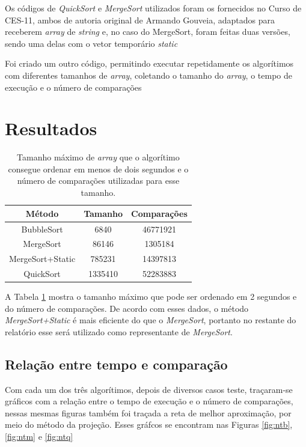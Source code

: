 \documentclass[12pt,a4paper,oneside]{article}
\begin{document}
\quad Os códigos de \textit{QuickSort} e \textit{MergeSort} utilizados foram os fornecidos no Curso de CES-11, ambos de autoria original de Armando Gouveia, adaptados para receberem \textit{array} de \textit{string} e, no caso do MergeSort, foram feitas duas versões, sendo uma delas com o vetor temporário \textit{static}

\quad Foi criado um outro código, permitindo executar repetidamente os algorítimos com diferentes tamanhos de \textit{array}, coletando o tamanho do \textit{array}, o tempo de execução e o número de comparações

\section{Resultados}

\begin{table}[H]
\caption{Tamanho máximo de \textit{array} que o algorítimo consegue ordenar em menos de dois segundos e o número de comparações utilizadas para esse tamanho.}
\begin{center}
\begin{tabular}{|c|c c|}
\hline
Método			& Tamanho	& Comparações	\\
\hline
BubbleSort		& 6840		& 46771921			\\
MergeSort		& 86146	& 1305184			\\
MergeSort+Static	& 785231	& 14397813			\\
QuickSort		& 1335410	& 52283883			\\
\hline
\end{tabular}
\label{tab:tmax}
\end{center}
\end{table}

\quad A Tabela \ref{tab:tmax} mostra o tamanho máximo que pode ser ordenado em 2 segundos e do número de comparações. De acordo com esses dados, o método \textit{MergeSort+Static} é mais eficiente do que o \textit{MergeSort}, portanto no restante do relatório esse será utilizado como representante de \textit{MergeSort}.

\subsection{Relação entre tempo e comparação}

\quad Com cada um dos três algorítimos, depois de diversos casos teste, traçaram-se gráficos com a relação entre o tempo de execução e o número de comparações, nessas mesmas figuras também foi traçada a reta de melhor aproximação, por meio do método da projeção. Esses gráfcos se encontram nas Figuras \ref{fig:ntb}, \ref{fig:ntm} e \ref{fig:ntq}
\end{document}
